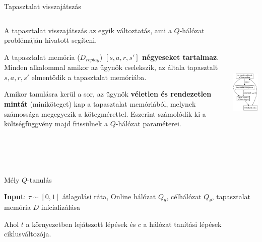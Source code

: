 \documentclass[english, aspectratio=169]{beamer}
\begin{document}
\begin{frame}{Tapasztalat visszajátszás}
\begin{columns}
\begin{column}{.65\textwidth}
A tapasztalat visszajátszás az egyik változtatás, ami a $Q$-hálózat problémáján hivatott segíteni.\par\smallskip
A tapasztalat memória ($D_{replay}$) \textbf{$[s,a,r,s']$ négyeseket tartalmaz}. Minden alkalommal amikor az ügynök cselekszik, az általa tapasztalt $s, a, r, s'$ elmentődik a tapasztalat memóriába.\par\smallskip
Amikor tanulásra kerül a sor, az ügynök \textbf{véletlen és rendezetlen mintát} (miniköteget) kap a tapasztalat memóriából, melynek számossága megegyezik a kötegmérettel. Eszerint számolódik ki a költségfüggvény majd frissülnek a $Q$-hálózat paraméterei.
\end{column}
\begin{column}{.35\textwidth}
\begin{center}
\includegraphics[height=7cm, keepaspectratio]{../../5_ql/doc/graphs/ql_4.png}
\end{center}
\end{column}
\end{columns}
\end{frame}

\begin{frame}{}
\begin{algorithm}[H]
\caption{Mély $Q$-tanulás}
\SetAlgoLined
\textbf{Input}: $\tau \sim [0,1]$ átlagolási ráta,
Online hálózat $Q_\theta$, célhálózat $Q_{\bar{\theta}}$, tapasztalat memória $D$ inícializálása\;
\end{algorithm}
Ahol $t$ a környezetben lejátszott lépések és $c$ a hálózat tanítási lépések ciklusváltozója.
\end{frame}
\end{document}
